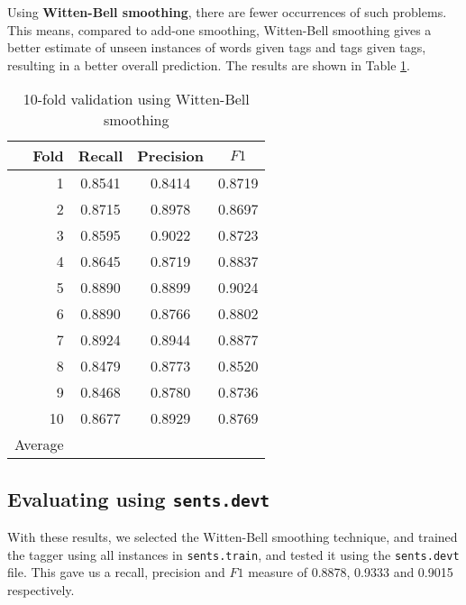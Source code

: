 \documentclass[12pt]{homework}
\begin{document}
Using \textbf{Witten-Bell smoothing}, there are fewer occurrences of such 
problems. This means, compared to add-one smoothing, Witten-Bell smoothing gives 
a better estimate of unseen instances of words given tags and tags given tags, 
resulting in a better overall prediction. The results are shown in Table 
\ref{wbresult}.
\begin{table}
	\begin{center}
	\begin{tabular}{r | c c c}
	\hline
	Fold	&	Recall	&	Precision	&	$F1$ \\
	\hline
	1		&	0.8541	&	0.8414		&	0.8719\\
	2		&	0.8715	&	0.8978		&	0.8697\\
	3		&	0.8595	&	0.9022		&	0.8723\\
	4		&	0.8645	&	0.8719		&	0.8837\\
	5		&	0.8890	&	0.8899		&	0.9024\\
	6		&	0.8890	&	0.8766		&	0.8802\\
	7		&	0.8924	&	0.8944		&	0.8877\\
	8		&	0.8479	&	0.8773		&	0.8520\\
	9		&	0.8468	&	0.8780		&	0.8736\\
	10		&	0.8677	&	0.8929		&	0.8769\\
	\hline
	Average	&		&		&			\\
	\hline
	\end{tabular}

	\end{center}
	\caption{10-fold validation using Witten-Bell smoothing}
	\label{wbresult}
\end{table}
\subsection{Evaluating using \texttt{sents.devt}}

With these results, we selected the Witten-Bell smoothing technique, and trained 
the tagger using all instances in \texttt{sents.train}, and tested it using the 
\texttt{sents.devt} file. This gave us a recall, precision and $F1$ measure of 
0.8878, 0.9333 and 	0.9015 respectively.
\end{document}
